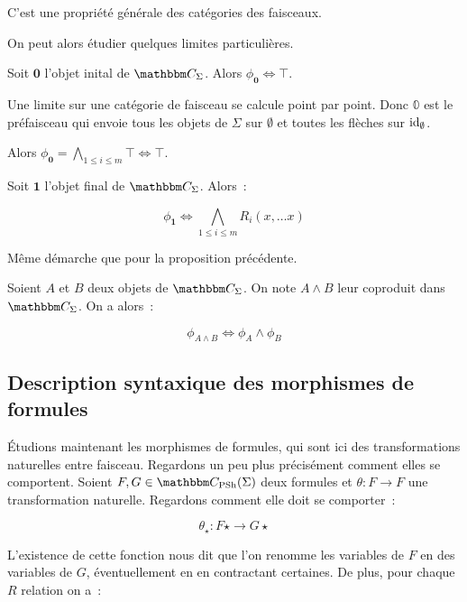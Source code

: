 \begin{pv}
    C'est une propriété générale des catégories des faisceaux.
\end{pv}

On peut alors étudier quelques limites particulières.

\begin{lem}
    Soit $\mathbf{0}$ l'objet inital de $\C_\Sigma$. Alors $\phi_\mathbf{0}\iff\top$.
\end{lem}

\begin{pv}
    Une limite sur une catégorie de faisceau se calcule point par point. Donc $\mathbb{0}$
    est le préfaisceau qui envoie tous les objets de $\Sigma$ sur $\emptyset$ et toutes
    les flèches sur $\operatorname{id}_\emptyset$.

    Alors $\phi_\mathbf{0} = \bigwedge_{1\leq i\leq m}\top \iff \top$.
\end{pv}

\begin{lem}
    Soit $\mathbf{1}$ l'objet final de $\C_\Sigma$. Alors~:

    \[\phi_\mathbf{1} \iff \bigwedge_{1\leq i\leq m}R_i(x,\dots x)\]
\end{lem}

\begin{pv}
    Même démarche que pour la proposition précédente.
\end{pv}

\begin{lem}
    Soient $A$ et $B$ deux objets de $\C_\Sigma$. On note $A\wedge B$ leur coproduit
    dans $\C_\Sigma$. On a alors~:

    \[\phi_{A\wedge B} \iff \phi_A\wedge\phi_B \]
\end{lem}

\subsection{Description syntaxique des morphismes de formules}

Étudions maintenant les morphismes de formules, qui sont ici des transformations
naturelles entre faisceau. Regardons un peu plus précisément comment elles se
comportent. Soient $F,G\in\C_\psh(\Sigma)$ deux formules et $\theta:F\rightarrow F$
une transformation naturelle. Regardons comment elle doit se comporter~:

\[ \theta_\star : F\star \rightarrow G\star \]

L'existence de cette fonction nous dit que l'on renomme les variables de $F$ en des
variables de $G$, éventuellement en en contractant certaines. De plus, pour chaque
$R$ relation on a~:

